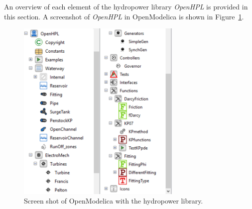 \documentclass[%
]{USN-PhD}
\begin{document}
An overview of each element of the hydropower library \emph{OpenHPL} is provided in this section. A screenshot of \emph{OpenHPL} in OpenModelica is shown in Figure~\ref{fig:fig1}.
\begin{figure}[!ht]
  \centering
 \includegraphics[width=0.7\textwidth]{fig/Bilde1}
 \caption{Screen shot of OpenModelica with the hydropower library.}
  \label{fig:fig1}
\end{figure}
\end{document}
